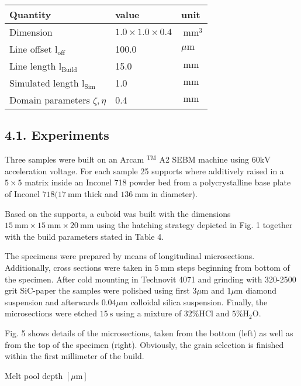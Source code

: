 \documentclass[10pt]{article}
\begin{document}
\begin{center}
\begin{tabular}{lll}
\hline
Quantity & value & unit \\
\hline
Dimension & $1.0 \times 1.0 \times 0.4$ & $\mathrm{~mm}^{3}$ \\
Line offset $\mathrm{l}_{\text {off }}$ & 100.0 & $\mu \mathrm{m}$ \\
Line length $\mathrm{l}_{\text {Build }}$ & 15.0 & $\mathrm{~mm}$ \\
Simulated length $\mathrm{l}_{\text {Sim }}$ & 1.0 & $\mathrm{~mm}$ \\
Domain parameters $\zeta, \eta$ & 0.4 & $\mathrm{~mm}$ \\
\hline
\end{tabular}
\end{center}

\subsection*{4.1. Experiments}
Three samples were built on an Arcam $^{\mathrm{TM}}$ A2 SEBM machine using $60 \mathrm{kV}$ acceleration voltage. For each sample 25 supports where additively raised in a $5 \times 5$ matrix inside an Inconel 718 powder bed from a polycrystalline base plate of Inconel $718(17 \mathrm{~mm}$ thick and $136 \mathrm{~mm}$ in diameter).

Based on the supports, a cuboid was built with the dimensions $15 \mathrm{~mm} \times 15 \mathrm{~mm} \times 20 \mathrm{~mm}$ using the hatching strategy depicted in Fig. 1 together with the build parameters stated in Table 4.

The specimens were prepared by means of longitudinal microsections. Additionally, cross sections were taken in $5 \mathrm{~mm}$ steps beginning from bottom of the specimen. After cold mounting in Technovit 4071 and grinding with 320-2500 grit SiC-paper the samples were polished using first $3 \mu \mathrm{m}$ and $1 \mu \mathrm{m}$ diamond suspension and afterwards $0.04 \mu \mathrm{m}$ colloidal silica suspension. Finally, the microsections were etched $15 \mathrm{~s}$ using a mixture of $32 \% \mathrm{HCl}$ and $5 \% \mathrm{H}_{2} \mathrm{O}$.

Fig. 5 shows details of the microsections, taken from the bottom (left) as well as from the top of the specimen (right). Obviously, the grain selection is finished within the first millimeter of the build.

Melt pool depth $[\mu \mathrm{m}]$
\end{document}
